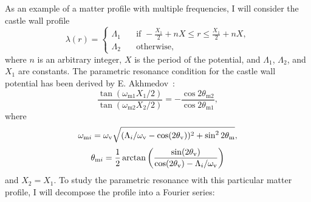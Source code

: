 As an example of a matter profile with multiple frequencies, I will consider the castle wall profile
\begin{equation}
    \lambda(r) = \begin{cases}
\Lambda_1 &\quad \text{if } -\frac{X_1}{2}+nX\le r\le \frac{X_1}{2}+nX, \\
\Lambda_2 &\quad \text{otherwise}, %
\end{cases}
\label{eq-castle-wall-potential}
\end{equation}
where $n$ is an arbitrary integer, $X$ is the period of the potential, and $\Lambda_1$, $\Lambda_2$, and $X_1$ are constants. The parametric resonance condition for the castle wall potential has been derived by E. Akhmedov~\cite{Akhmedov2000}:
\begin{equation}
    \frac{\tan (\omega_{\mathrm m1}X_1/2)}{\tan (\omega_{\mathrm m2}X_2/2)} = - \frac{\cos 2\theta_{\mathrm m2}}{\cos 2\theta_{\mathrm m1}},
    \label{eq-akhmedov-resonance-condition-castle-wall}
\end{equation}
where
\begin{equation}
    \omega_{\mathrm m i} = \omega_\mathrm v \sqrt{ ( \Lambda_i/\omega_\mathrm v - \cos (2\theta_\mathrm v) )^2  + \sin^2 2\theta_\mathrm m },
\end{equation}
\begin{equation}
\theta_{\mathrm m i} = \frac{1}{2} \arctan \left( \frac{\sin (2\theta_\mathrm v)}{  \cos (2\theta_\mathrm v) - \Lambda_i/\omega_\mathrm v} \right)
\end{equation}
and $X_2 = X_1$. To study the parametric resonance with this particular matter profile, I will decompose the profile into a Fourier series:
